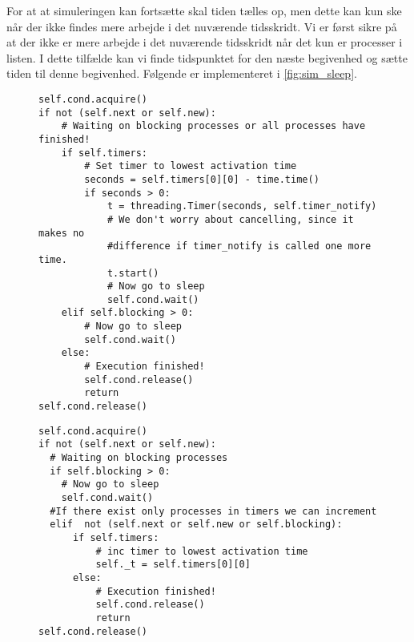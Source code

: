 For at at simuleringen kan fortsætte skal tiden tælles op, men dette kan kun ske når der ikke findes mere arbejde i det nuværende tidsskridt.  Vi er først sikre på at der ikke er mere arbejde i det nuværende tidsskridt når det kun er processer i  listen. I dette tilfælde kan vi finde tidspunktet for den næste begivenhed og sætte tiden til denne begivenhed. Følgende er implementeret i \cref{fig:sim_sleep}.
\begin{figure}[hbtp]
\begin{minipage}[c]{\linewidth}
\begin{lstlisting}[firstnumber=239, label=fig:blocking_sleep, caption=Uddrag af \sched en i \code{Scheduler}]
self.cond.acquire()
if not (self.next or self.new):
    # Waiting on blocking processes or all processes have finished!
    if self.timers:
        # Set timer to lowest activation time
        seconds = self.timers[0][0] - time.time()
        if seconds > 0:
            t = threading.Timer(seconds, self.timer_notify)
            # We don't worry about cancelling, since it makes no 
            #difference if timer_notify is called one more time.
            t.start()
            # Now go to sleep
            self.cond.wait()
    elif self.blocking > 0:
        # Now go to sleep
        self.cond.wait()
    else:
        # Execution finished!
        self.cond.release()
        return
self.cond.release()
\end{lstlisting}
\end{minipage}
\begin{minipage}[c]{\linewidth}
\begin{lstlisting}[firstnumber=158, label=fig:sim_sleep, caption= uddrag af \sched en i \code{Simulation}]
self.cond.acquire()
if not (self.next or self.new):
  # Waiting on blocking processes
  if self.blocking > 0:
    # Now go to sleep
    self.cond.wait()
  #If there exist only processes in timers we can increment
  elif  not (self.next or self.new or self.blocking): 
      if self.timers:
          # inc timer to lowest activation time
          self._t = self.timers[0][0]
      else:
          # Execution finished!
          self.cond.release()
          return
self.cond.release()  
\end{lstlisting}
\end{minipage}
\end{figure}

